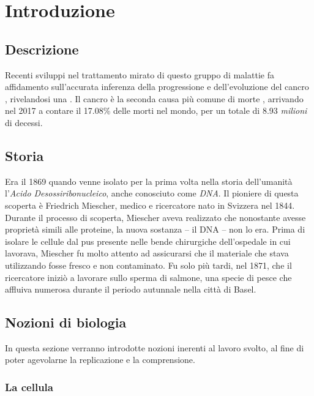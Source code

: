 
\chapter{Introduzione}


\section{Descrizione}
Recenti sviluppi nel trattamento mirato di questo gruppo di malattie fa affidamento sull'accurata inferenza della progressione e dell'evoluzione del cancro \cite{Ciccolella268243}, rivelandosi una . Il cancro è la seconda causa più comune di morte \cite{worldindatacancer}, arrivando nel 2017 a contare il 17.08\% delle morti nel mondo, per un totale di 8.93 \textit{milioni} di decessi.


\section{Storia}

Era il 1869 quando venne isolato per la prima volta nella storia dell'umanità l'\textit{Acido Desossiribonucleico}, anche conosciuto come \textit{DNA}. Il pioniere di questa scoperta è Friedrich Miescher, medico e ricercatore nato in Svizzera nel 1844. Durante il processo di scoperta, Miescher aveva realizzato che nonostante  avesse proprietà simili alle proteine, la nuova sostanza -- il DNA -- non lo era. Prima di isolare le cellule dal pus presente nelle bende chirurgiche dell'ospedale in cui lavorava, Miescher fu molto attento ad assicurarsi che il materiale che stava utilizzando fosse fresco e non contaminato. Fu solo più tardi, nel 1871, che il ricercatore iniziò a lavorare sullo sperma di salmone, una specie di pesce che affluiva numerosa durante il periodo autunnale nella città di Basel.


\section{Nozioni di biologia}

In questa sezione verranno introdotte nozioni inerenti al lavoro svolto, al fine di poter agevolarne la replicazione e la comprensione.

\subsection{La cellula}

